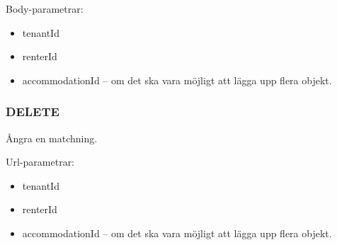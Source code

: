\documentclass{article}
\begin{document}
Body-parametrar:

\begin{itemize}
    \item tenantId
    \item renterId
    \item accommodationId -- om det ska vara möjligt att lägga upp flera objekt.
\end{itemize}

\subsubsection {DELETE}
\label{ssub:DELETE}

Ångra en matchning.

Url-parametrar:

\begin{itemize}
    \item tenantId
    \item renterId
    \item accommodationId -- om det ska vara möjligt att lägga upp flera objekt.
\end{itemize}
\end{document}
